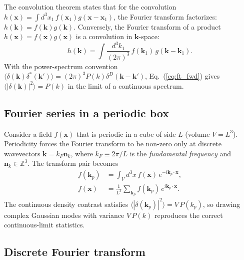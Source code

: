 \documentclass[12pt]{article}
\newcommand{\bx}{\mathbf{x}}
\newcommand{\bk}{\mathbf{k}}
\begin{document}
The convolution theorem states that for the convolution
$h(\bx) = \int d^3x_1\,f(\bx_1)g(\bx-\bx_1)$, the Fourier transform
factorizes: $h(\bk) = f(\bk)g(\bk)$.
Conversely, the Fourier transform of a product $h(\bx) = f(\bx)g(\bx)$
is a convolution in $\bk$-space:
%
\begin{equation}
  h(\bk) = \int \frac{d^3k_1}{(2\pi)^3}\,f(\bk_1)\,g(\bk-\bk_1).
  \label{eq:conv}
\end{equation}
%
With the power-spectrum convention
$\langle\delta(\bk)\delta^*(\bk')\rangle =
(2\pi)^3P(k)\delta^D(\bk-\bk')$,
Eq.~(\ref{eq:ft_fwd}) gives $\langle|\delta(\bk)|^2\rangle = P(k)$
in the limit of a continuous spectrum.

\subsection{Fourier series in a periodic box}
\label{app:fft_series}

Consider a field $f(\bx)$ that is periodic in a cube of side $L$
(volume $V = L^3$).  Periodicity forces the Fourier transform to be
non-zero only at discrete wavevectors
$\bk = k_F\mathbf{n}_k$, where $k_F \equiv 2\pi/L$ is the
\emph{fundamental frequency} and $\mathbf{n}_k\in\mathbb{Z}^3$.
The transform pair becomes
%
\begin{align}
  f(\bk_p) &= \int_V d^3x\, f(\bx)\,e^{-i\bk_p\cdot\bx},
  \label{eq:fs_fwd}\\
  f(\bx)   &= \frac{1}{L^3}\sum_{\bk_p} f(\bk_p)\,e^{i\bk_p\cdot\bx}.
  \label{eq:fs_inv}
\end{align}
%
The continuous density contrast satisfies
$\langle|\delta(\bk_p)|^2\rangle = V\,P(k_p)$,
so drawing complex Gaussian modes with variance $V\,P(k)$ reproduces
the correct continuous-limit statistics.

\subsection{Discrete Fourier transform}
\label{app:fft_dft}
\end{document}
